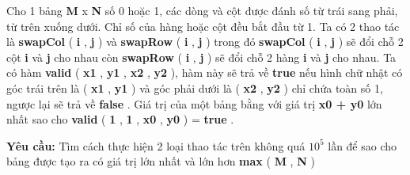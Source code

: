 Cho 1 bảng   \textbf{    M   }   x   \textbf{    N   }   số 0 hoặc 1, các dòng và cột được đánh số từ trái sang phải, từ trên xuống dưới. Chỉ số của hàng hoặc cột đều bắt đầu từ 1. Ta có 2 thao tác là   \textbf{    swapCol   }   (   \textbf{    i   }   ,   \textbf{    j   }   ) và   \textbf{    swapRow   }   (   \textbf{    i   }   ,   \textbf{    j   }   ) trong đó   \textbf{    swapCol   }   (   \textbf{    i   }   ,   \textbf{    j   }   ) sẽ đổi chỗ 2 cột   \textbf{    i   }   và   \textbf{    j   }   cho nhau còn   \textbf{    swapRow   }   (   \textbf{    i   }   ,   \textbf{    j   }   ) sẽ đổi chỗ 2 hàng   \textbf{    i   }   và   \textbf{    j   }   cho nhau. Ta có hàm   \textbf{    valid   }   (   \textbf{    x1   }   ,   \textbf{    y1   }   ,   \textbf{    x2   }   ,   \textbf{    y2   }   ), hàm này sẽ trả về   \textbf{    true   }   nếu hình chữ nhật có góc trái trên là (   \textbf{    x1   }   ,   \textbf{    y1   }   ) và góc phải dưới là (   \textbf{    x2   }   ,   \textbf{    y2   }   ) chỉ chứa toàn số 1, ngược lại sẽ trả về   \textbf{    false   }   . Giá trị của một bảng bằng với giá trị   \textbf{\textbf{     x0    }    +    \textbf{     y0    }}   lớn nhất sao cho   \textbf{    valid   }   (   \textbf{    1   }   ,   \textbf{    1   }   ,   \textbf{    x0   }   ,   \textbf{    y0   }   ) =   \textbf{    true   }   .  

\textbf{    Yêu cầu:   }   Tìm cách thực hiện 2 loại thao tác trên không quá   \textbf{    $10^{5}$}   lần để sao cho bảng được tạo ra có giá trị lớn nhất và lớn hơn   \textbf{    max   }   (   \textbf{    M   }   ,   \textbf{    N   }   )